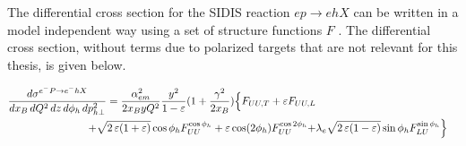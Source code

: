 
The differential cross section for the SIDIS reaction $ep \rightarrow ehX$ can be written in a model independent way using a set of structure functions $F$ \cite{tmds-mulders:1995}.  The differential cross section, without terms due to polarized targets that are not relevant for this thesis, is given below.

\begin{eqnarray}
  \frac{d\sigma^{e^-P\to e^-hX}}{dx_B \, dQ^{2}\, dz\, d\phi_h\, d p_{h\perp}^2} = \frac{\alpha^2_{em}}{2x_B y Q^2} \frac{y^2}{1-\varepsilon}  ( 1+\frac{\gamma^2}{2x_B} ) \Bigl\{ F_{UU ,T} +  \varepsilon F_{UU ,L} \nonumber \\
  + \sqrt{2\,\varepsilon (1+\varepsilon)} \cos\phi_h F_{UU}^{\cos\phi_h}+ \varepsilon \cos(2\phi_h) F_{UU}^{\cos 2\phi_h} +& \lambda_e
\sqrt{2\,\varepsilon (1-\varepsilon)} \sin\phi_h F_{LU}^{\sin\phi_h} \Bigr\}
\end{eqnarray}

